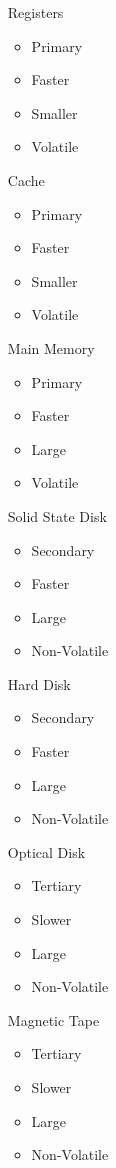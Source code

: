 \documentclass{article}
\begin{document}
\begin{itemize}
	\item[Registers]
		\begin{itemize}
			\item Primary
			\item Faster
			\item Smaller
			\item Volatile 
		\end{itemize}
	\item[Cache]
		\begin{itemize}
			\item Primary
			\item Faster
			\item Smaller
			\item Volatile 
		\end{itemize}
	\item[Main Memory]
		\begin{itemize}
			\item Primary
			\item Faster
			\item Large
			\item Volatile 
		\end{itemize}
	\item[Solid State Disk]
		\begin{itemize}
			\item Secondary 
			\item Faster
			\item Large
			\item Non-Volatile
		\end{itemize}
	\item[Hard Disk]
		\begin{itemize}
			\item Secondary 
			\item Faster
			\item Large
			\item Non-Volatile
		\end{itemize}
	\item[Optical Disk]
		\begin{itemize}
			\item Tertiary 
			\item Slower
			\item Large
			\item Non-Volatile
		\end{itemize}
	\item[Magnetic Tape]
		\begin{itemize}
			\item Tertiary 
			\item Slower
			\item Large
			\item Non-Volatile
		\end{itemize}
\end{itemize}
\end{document}
